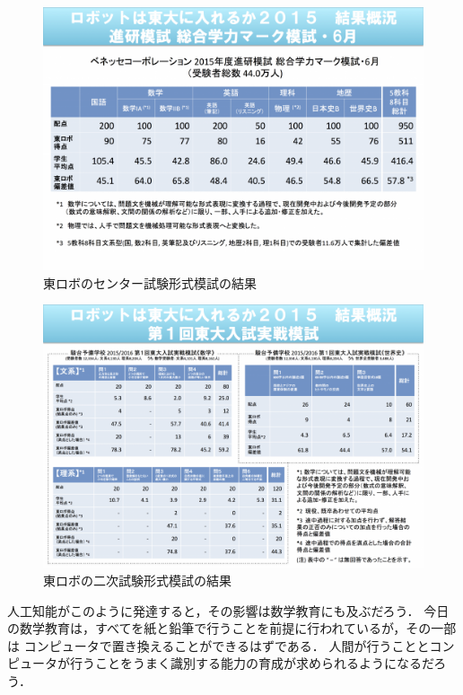 \begin{figure}[h]
\centering
\includegraphics[width=15cm]{TOROBO2015gaikyo_1.png}
\caption{東ロボのセンター試験形式模試の結果}\label{図}
\end{figure}


\begin{figure}[h]
\centering
\includegraphics[width=15cm]{TOROBO2015gaikyo_2.png}
\caption{東ロボの二次試験形式模試の結果}\label{図}
\end{figure}




人工知能がこのように発達すると，その影響は数学教育にも及ぶだろう．
今日の数学教育は，すべてを紙と鉛筆で行うことを前提に行われているが，その一部は コンピュータで置き換えることができるはずである．
人間が行うこととコンピュータが行うことをうまく識別する能力の育成が求められるようになるだろう．



